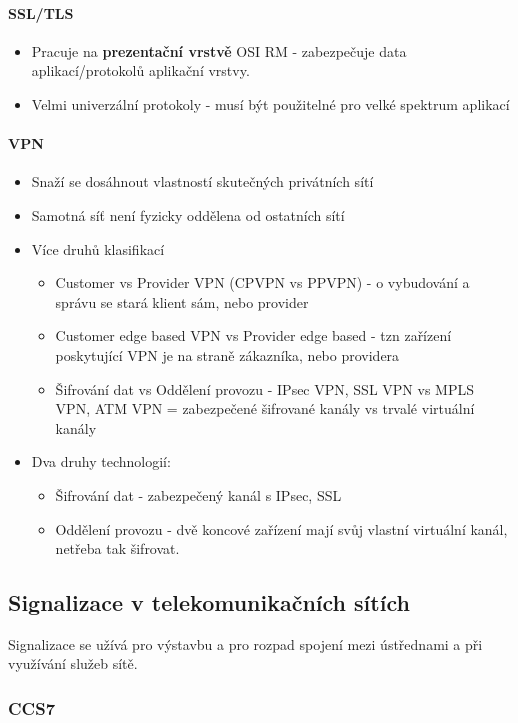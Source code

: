 \documentclass[10pt,a4paper]{article}
\begin{document}
\paragraph{SSL/TLS}

\begin{itemize}
\item Pracuje na \textbf{prezentační vrstvě} OSI RM - zabezpečuje data aplikací/protokolů aplikační vrstvy.
\item Velmi univerzální protokoly - musí být použitelné pro velké spektrum aplikací
\end{itemize}
\paragraph{VPN}

\begin{itemize}
\item Snaží se dosáhnout vlastností skutečných privátních sítí
\item Samotná síť není fyzicky oddělena od ostatních sítí
\item Více druhů klasifikací
\begin{itemize}
\item Customer vs Provider VPN (CPVPN vs PPVPN) - o vybudování a správu se stará klient sám, nebo provider
\item Customer edge based VPN vs Provider edge based - tzn zařízení poskytující VPN je na straně zákazníka, nebo providera
\item Šifrování dat vs Oddělení provozu - IPsec VPN, SSL VPN vs MPLS VPN, ATM VPN = zabezpečené šifrované kanály vs trvalé virtuální kanály

\end{itemize}
\item Dva druhy technologií:
\begin{itemize}
\item Šifrování dat - zabezpečený kanál s IPsec, SSL
\item Oddělení provozu - dvě koncové zařízení mají svůj vlastní virtuální kanál, netřeba tak šifrovat.
\end{itemize}
\end{itemize}
\subsection{Signalizace v telekomunikačních sítích}
Signalizace se užívá pro výstavbu a pro rozpad spojení mezi ústřednami a při využívání služeb sítě.
\subsubsection{CCS7}
\end{document}
